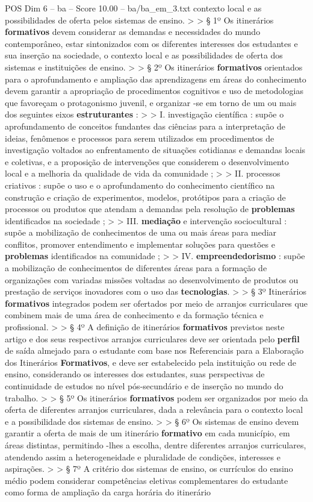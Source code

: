 \begin{textsample}{POS Dim 6 – ba – Score 10.00 – ba/ba\_em\_3.txt}
contexto local e as possibilidades de oferta pelos sistemas de ensino. > > § 1º Os itinerários \textbf{formativos} devem considerar as demandas e necessidades do mundo contemporâneo, estar sintonizados com os diferentes interesses dos estudantes e sua inserção na sociedade, o contexto local e as possibilidades de oferta dos sistemas e instituições de ensino. > > § 2º Os itinerários \textbf{formativos} orientados para o aprofundamento e ampliação das aprendizagens em áreas do conhecimento devem garantir a apropriação de procedimentos cognitivos e uso de metodologias que favoreçam o protagonismo juvenil, e organizar -se em torno de um ou mais dos seguintes eixos \textbf{estruturantes} : > > I. investigação científica : supõe o aprofundamento de conceitos fundantes das ciências para a interpretação de ideias, fenômenos e processos para serem utilizados em procedimentos de investigação voltados ao enfrentamento de situações cotidianas e demandas locais e coletivas, e a proposição de intervenções que considerem o desenvolvimento local e a melhoria da qualidade de vida da comunidade ; > > II. processos criativos : supõe o uso e o aprofundamento do conhecimento científico na construção e criação de experimentos, modelos, protótipos para a criação de processos ou produtos que atendam a demandas pela resolução de \textbf{problemas} identificados na sociedade ; > > III. \textbf{mediação} e intervenção sociocultural : supõe a mobilização de conhecimentos de uma ou mais áreas para mediar conflitos, promover entendimento e implementar soluções para questões e \textbf{problemas} identificados na comunidade ; > > IV. \textbf{empreendedorismo} : supõe a mobilização de conhecimentos de diferentes áreas para a formação de organizações com variadas missões voltadas ao desenvolvimento de produtos ou prestação de serviços inovadores com o uso das \textbf{tecnologias}. > > § 3º Itinerários \textbf{formativos} integrados podem ser ofertados por meio de arranjos curriculares que combinem mais de uma área de conhecimento e da formação técnica e profissional. > > § 4º A definição de itinerários \textbf{formativos} previstos neste artigo e dos seus respectivos arranjos curriculares deve ser orientada pelo \textbf{perfil} de saída almejado para o estudante com base nos Referenciais para a Elaboração dos Itinerários \textbf{Formativos}, e deve ser estabelecido pela instituição ou rede de ensino, considerando os interesses dos estudantes, suas perspectivas de continuidade de estudos no nível pós-secundário e de inserção no mundo do trabalho. > > § 5º Os itinerários \textbf{formativos} podem ser organizados por meio da oferta de diferentes arranjos curriculares, dada a relevância para o contexto local e a possibilidade dos sistemas de ensino. > > § 6º Os sistemas de ensino devem garantir a oferta de mais de um itinerário \textbf{formativo} em cada município, em áreas distintas, permitindo -lhes a escolha, dentre diferentes arranjos curriculares, atendendo assim a heterogeneidade e pluralidade de condições, interesses e aspirações. > > § 7º A critério dos sistemas de ensino, os currículos do ensino médio podem considerar competências eletivas complementares do estudante como forma de ampliação da carga horária do itinerário 
\end{textsample}
